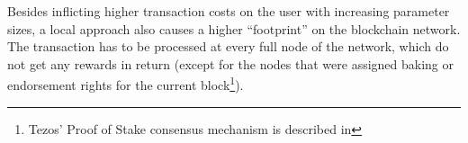 Besides inflicting higher transaction costs on the user with increasing parameter sizes, a local approach also causes a higher ``footprint'' on the blockchain network. The transaction has to be processed at every full node of the network, which do not get any rewards in return (except for the nodes that were assigned baking or endorsement rights for the current block\footnote{Tezos' Proof of Stake consensus mechanism is described in }).
